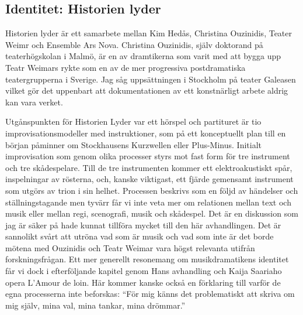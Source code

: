 \documentclass[a4paper]{article}
\begin{document}


\subsection*{Identitet: Historien lyder}

Historien lyder är ett samarbete mellan Kim Hedås, Christina Ouzinidis, Teater Weimr och Ensemble Ars Nova. Christina Ouzinidis, själv doktorand på teaterhögskolan i Malmö, är en av dramtikerna som varit med att bygga upp Teatr Weimars rykte som en av de mer progressiva postdramatiska teatergrupperna i Sverige. Jag såg uppsättningen i Stockholm på teater Galeasen vilket gör det uppenbart att dokumentationen av ett konstnärligt arbete aldrig kan vara verket.

Utgånspunkten för Historien Lyder var ett hörspel och partituret är tio improvisationsmodeller med instruktioner, som på ett konceptuellt plan till en början påminner om Stockhausens Kurzwellen eller Plus-Minus. Initialt improvisation som genom olika processer styrs mot fast form för tre instrument och tre skådespelare. Till de tre instrumenten kommer ett elektroakustiskt spår, inspelningar av rösterna, och, kanske viktigast, ett fjärde gemensamt instrument som utgörs av trion i sin helhet. Processen beskrivs som en följd av händelser och ställningstagande men tyvärr får vi inte veta mer om relationen mellan text och musik eller mellan regi, scenografi, musik och skådespel. Det är en diskussion som jag är säker på hade kunnat tillföra mycket till den här avhandlingen. Det är sannolikt svårt att utröna vad som är musik och vad som inte är det borde mötena med Ouzinidis och Teatr Weimar vara högst relevanta utifrån forskningsfrågan. Ett mer generellt resonemang om musikdramatikens identitet får vi dock i efterföljande kapitel genom Hans \cite{gefors2011} avhandling och Kaija Saariaho opera L'Amour de loin. Här kommer kanske också en förklaring till varför de egna processerna inte beforskas: ``För mig känns det problematiskt att skriva om mig själv, mina val, mina tankar, mina drömmar.''
\end{document}
